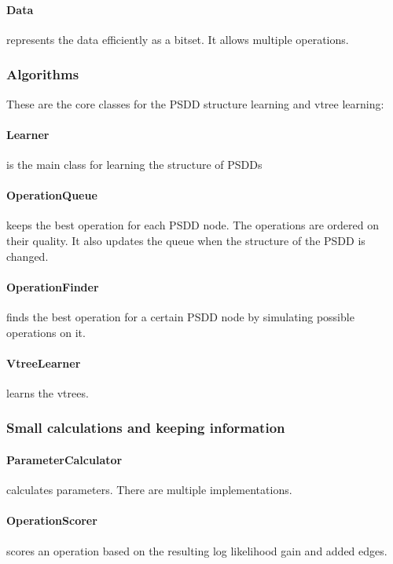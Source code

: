 \documentclass[a4paper,10pt]{article}
\begin{document}
\paragraph{Data} represents the data efficiently as a bitset. It allows multiple operations.

\subsubsection{Algorithms}
These are the core classes for the PSDD structure learning and vtree learning:

\paragraph{Learner} is the main class for learning the structure of PSDDs

\paragraph{OperationQueue} keeps the best operation for each PSDD node. The operations are ordered on their quality. It also updates the queue when the structure of the PSDD is changed.

\paragraph{OperationFinder} finds the best operation for a certain PSDD node by simulating possible operations on it.

\paragraph{VtreeLearner} learns the vtrees.


\subsubsection{Small calculations and keeping information}
\paragraph{ParameterCalculator} calculates parameters. There are multiple implementations.

\paragraph{OperationScorer} scores an operation based on the resulting log likelihood gain and added edges.
\end{document}
